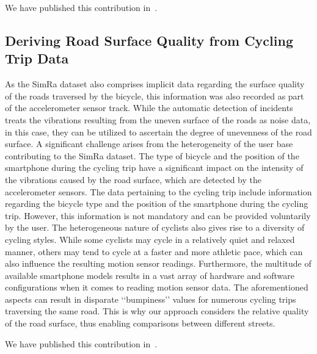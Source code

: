 We have published this contribution in~\cite{karakaya2020simra,karakaya2022cyclesense}.

\subsection{Deriving Road Surface Quality from Cycling Trip Data}
\label{subsec:road_surface_contribution}
As the SimRa dataset also comprises implicit data regarding the surface quality of the roads traversed by the bicycle, this information was also recorded as part of the accelerometer sensor track.
While the automatic detection of incidents treats the vibrations resulting from the uneven surface of the roads as noise data, in this case, they can be utilized to ascertain the degree of unevenness of the road surface.
A significant challenge arises from the heterogeneity of the user base contributing to the SimRa dataset.
The type of bicycle and the position of the smartphone during the cycling trip have a significant impact on the intensity of the vibrations caused by the road surface, which are detected by the accelerometer sensors.
The data pertaining to the cycling trip include information regarding the bicycle type and the position of the smartphone during the cycling trip. However, this information is not mandatory and can be provided voluntarily by the user.
The heterogeneous nature of cyclists also gives rise to a diversity of cycling styles.
While some cyclists may cycle in a relatively quiet and relaxed manner, others may tend to cycle at a faster and more athletic pace, which can also influence the resulting motion sensor readings.
Furthermore, the multitude of available smartphone models results in a vast array of hardware and software configurations when it comes to reading motion sensor data.
The aforementioned aspects can result in disparate ‘‘bumpiness’’ values for numerous cycling trips traversing the same road.
This is why our approach considers the relative quality of the road surface, thus enabling comparisons between different streets.

We have published this contribution in~\cite{karakaya2023crowdsensing}.

